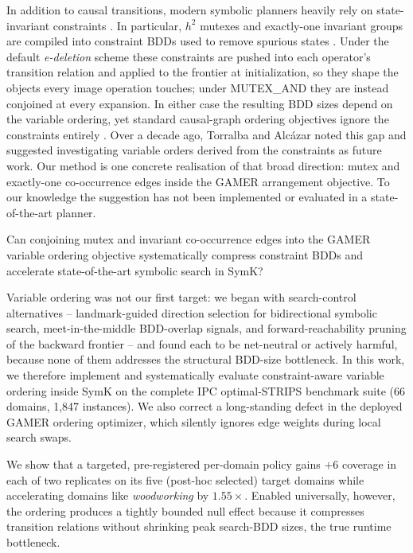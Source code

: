 \documentclass[twocolumn,10pt]{article}
\begin{document}
In addition to causal transitions, modern symbolic planners heavily rely on state-invariant constraints \cite{torralba2013constrained,torralba2017efficient}. In particular, $h^2$ mutexes and exactly-one invariant groups are compiled into constraint BDDs used to remove spurious states \cite{torralba2013constrained,torralba2017efficient}. Under the default \emph{e-deletion} scheme these constraints are pushed into each operator's transition relation and applied to the frontier at initialization, so they shape the objects every image operation touches; under \textsf{MUTEX\_AND} they are instead conjoined at every expansion. In either case the resulting BDD sizes depend on the variable ordering, yet standard causal-graph ordering objectives ignore the constraints entirely \cite{torralba2013constrained}. Over a decade ago, Torralba and Alc\'azar \cite{torralba2013constrained} noted this gap and suggested investigating variable orders derived from the constraints as future work. Our method is one concrete realisation of that broad direction: mutex and exactly-one co-occurrence edges inside the \textsf{GAMER} arrangement objective. To our knowledge the suggestion has not been implemented or evaluated in a state-of-the-art planner.

\begin{insightbox}
Can conjoining mutex and invariant co-occurrence edges into the \textsf{GAMER} variable ordering objective systematically compress constraint BDDs and accelerate state-of-the-art symbolic search in \textsf{SymK}?
\end{insightbox}

Variable ordering was not our first target: we began with search-control alternatives -- landmark-guided direction selection for bidirectional symbolic search, meet-in-the-middle BDD-overlap signals, and forward-reachability pruning of the backward frontier -- and found each to be net-neutral or actively harmful, because none of them addresses the structural BDD-size bottleneck. In this work, we therefore implement and systematically evaluate constraint-aware variable ordering inside \textsf{SymK} on the complete IPC optimal-STRIPS benchmark suite (66 domains, 1,847 instances). We also correct a long-standing defect in the deployed \textsf{GAMER} ordering optimizer, which silently ignores edge weights during local search swaps.

We show that a targeted, pre-registered per-domain policy gains $+6$ coverage in each of two replicates on its five (post-hoc selected) target domains while accelerating domains like \textit{woodworking} by $1.55\times$. Enabled universally, however, the ordering produces a tightly bounded null effect because it compresses transition relations without shrinking peak search-BDD sizes, the true runtime bottleneck.
\end{document}
